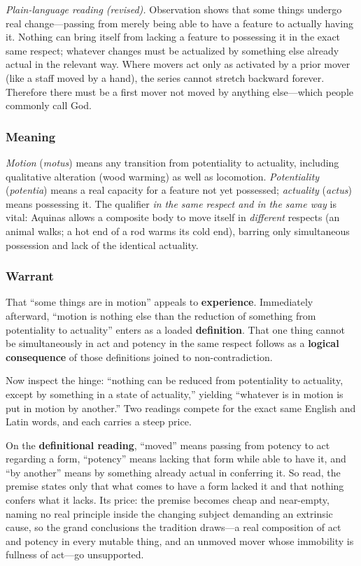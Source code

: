 \emph{Plain-language reading (revised).} Observation shows that some things undergo real change---passing from merely being able to have a feature to actually having it. Nothing can bring itself from lacking a feature to possessing it in the exact same respect; whatever changes must be actualized by something else already actual in the relevant way. Where movers act only as activated by a prior mover (like a staff moved by a hand), the series cannot stretch backward forever. Therefore there must be a first mover not moved by anything else---which people commonly call God.

\subsubsection*{Meaning}
\emph{Motion} (\emph{motus}) means any transition from potentiality to actuality, including qualitative alteration (wood warming) as well as locomotion. \emph{Potentiality} (\emph{potentia}) means a real capacity for a feature not yet possessed; \emph{actuality} (\emph{actus}) means possessing it. The qualifier \emph{in the same respect and in the same way} is vital: Aquinas allows a composite body to move itself in \emph{different} respects (an animal walks; a hot end of a rod warms its cold end), barring only simultaneous possession and lack of the identical actuality.

\subsubsection*{Warrant}
That ``some things are in motion'' appeals to \textbf{experience}. Immediately afterward, ``motion is nothing else than the reduction of something from potentiality to actuality'' enters as a loaded \textbf{definition}. That one thing cannot be simultaneously in act and potency in the same respect follows as a \textbf{logical consequence} of those definitions joined to non-contradiction.

Now inspect the hinge: ``nothing can be reduced from potentiality to actuality, except by something in a state of actuality,'' yielding ``whatever is in motion is put in motion by another.'' Two readings compete for the exact same English and Latin words, and each carries a steep price.

On the \textbf{definitional reading}, ``moved'' means passing from potency to act regarding a form, ``potency'' means lacking that form while able to have it, and ``by another'' means by something already actual in conferring it. So read, the premise states only that what comes to have a form lacked it and that nothing confers what it lacks. Its price: the premise becomes cheap and near-empty, naming no real principle inside the changing subject demanding an extrinsic cause, so the grand conclusions the tradition draws---a real composition of act and potency in every mutable thing, and an unmoved mover whose immobility is fullness of act---go unsupported.

